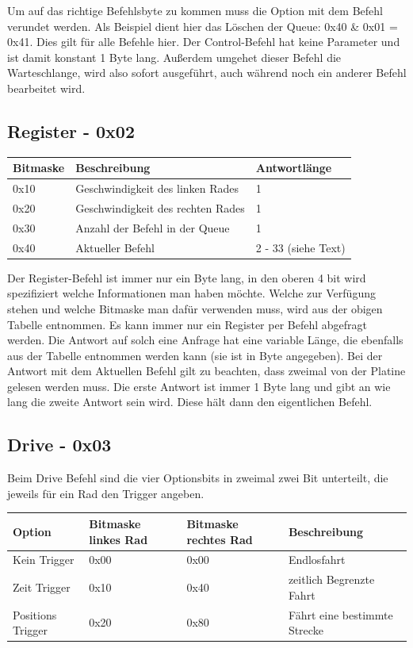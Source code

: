 \documentclass[a4paper]{article}
\begin{document}
	Um auf das richtige Befehlsbyte zu kommen muss die Option mit dem Befehl verundet werden. Als Beispiel dient hier das Löschen
	der Queue: 0x40 \& 0x01 = 0x41. Dies gilt für alle Befehle hier.
	Der Control-Befehl hat keine Parameter und ist damit konstant 1 Byte lang. Außerdem umgehet dieser Befehl die Warteschlange,
	wird also sofort ausgeführt, auch während noch ein anderer Befehl bearbeitet wird.

	\subsection{Register - 0x02}

	\begin{tabularx}{\linewidth}{|l|l|X|}
		\hline
		\textbf{Bitmaske} & \textbf{Beschreibung} & \textbf{Antwortlänge} \\
		\hline
		\hline
		0x10 				& Geschwindigkeit des linken Rades & 1 \\
		\hline
		0x20				& Geschwindigkeit des rechten Rades & 1 \\
		\hline
		0x30				& Anzahl der Befehl in der Queue & 1 \\
		\hline
		0x40				& Aktueller Befehl & 2 - 33 (siehe Text) \\
		\hline
	\end{tabularx}
	
	Der Register-Befehl ist immer nur ein Byte lang, in den oberen 4 bit wird spezifiziert welche Informationen man haben möchte.
	Welche zur Verfügung stehen und welche Bitmaske man dafür verwenden muss, wird aus der obigen Tabelle entnommen. Es kann immer
	nur ein Register per Befehl abgefragt werden. Die Antwort auf solch eine Anfrage hat eine variable Länge, die ebenfalls aus
	der Tabelle entnommen werden kann (sie ist in Byte angegeben).
	Bei der Antwort mit dem Aktuellen Befehl gilt zu beachten, dass zweimal von der Platine gelesen werden muss. Die erste
	Antwort ist immer 1 Byte lang und gibt an wie lang die zweite Antwort sein wird. Diese hält dann den eigentlichen Befehl.

	\subsection{Drive - 0x03}

	Beim Drive Befehl sind die vier Optionsbits in zweimal zwei Bit unterteilt, die jeweils für ein Rad den Trigger angeben.

	\begin{tabularx}{\linewidth}{|l|l|l|X|}
		\hline
		\textbf{Option} & \textbf{Bitmaske linkes Rad} & \textbf{Bitmaske rechtes Rad} & \textbf{Beschreibung} \\
		\hline
		\hline
		Kein Trigger	& 0x00						   & 0x00						   & Endlosfahrt \\
		\hline
		Zeit Trigger	& 0x10						   & 0x40						   & zeitlich Begrenzte Fahrt\\
		\hline
		Positions Trigger & 0x20					   & 0x80						   & Fährt eine bestimmte Strecke \\
		\hline
	\end{tabularx}
	
\end{document}
